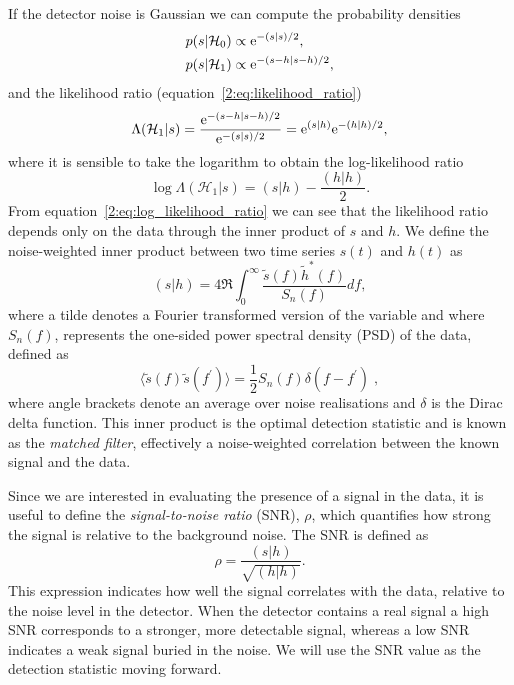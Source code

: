 If the detector noise is Gaussian we can compute the probability densities
%
\begin{align}
    p(s|\mathcal{H}_{0}) &\propto {\rm e}^{-(s|s)/2}, \\ 
    p(s|\mathcal{H}_{1}) &\propto {\rm e}^{-(s-h|s-h)/2},
\end{align}
%
and the likelihood ratio (equation~\ref{2:eq:likelihood_ratio})
%
\begin{equation}
    \Lambda(\mathcal{H}_{1}|s) = \frac{{\rm e}^{-(s-h|s-h)/2}}{{\rm e}^{-(s|s)/2}} = {\rm e}^{(s|h)}{\rm e}^{-(h|h)/2},
\end{equation}
%
where it is sensible to take the logarithm to obtain the log-likelihood ratio
%
\begin{equation}
    \log \Lambda(\mathcal{H}_{1}|s) = (s|h) - \frac{(h|h)}{2}.
    \label{2:eq:log_likelihood_ratio}
\end{equation}
%
From equation~\ref{2:eq:log_likelihood_ratio} we can see that the likelihood ratio depends only on the data through the inner product of $s$ and $h$. We define the noise-weighted inner product between two time series $s(t)$ and $h(t)$ as
%
\begin{equation}
  (s | h) = 4 \Re \int^{\infty}_{0} \frac{\tilde{s}(f) \tilde{h}^*(f)}{S_n(f)} df,
  \label{2:eqn:inner_product}
\end{equation}
%
where a tilde denotes a Fourier transformed version of the variable and where $S_n(f)$, represents the one-sided power spectral density (PSD) of the data, defined as
%
\begin{equation}
  \langle \tilde{s}(f) \tilde{s}(f^\prime) \rangle = \frac{1}{2} S_n(f) \delta(f - f^\prime) \;,
  \label{2:eqn:psd}
\end{equation}
%
where angle brackets denote an average over noise realisations and $\delta$ is the Dirac delta function. This inner product is the optimal detection statistic and is known as the \textit{matched filter}, effectively a noise-weighted correlation between the known signal and the data.

Since we are interested in evaluating the presence of a signal in the data, it is useful to define the \textit{signal-to-noise ratio} (SNR), \( \rho \), which quantifies how strong the signal is relative to the background noise. The SNR is defined as~\cite{FINDCHIRP:2012}
%
\begin{equation}
    \rho = \frac{(s|h)}{\sqrt{(h|h)}}.
    \label{2:eq:snr}
\end{equation}
%
This expression indicates how well the signal correlates with the data, relative to the noise level in the detector. When the detector contains a real signal a high SNR corresponds to a stronger, more detectable signal, whereas a low SNR indicates a weak signal buried in the noise. We will use the SNR value as the detection statistic moving forward.


